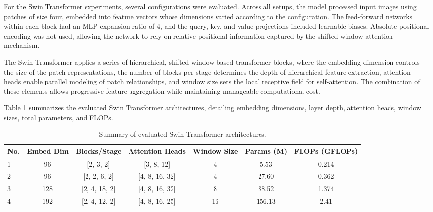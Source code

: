 \documentclass[a4paper,11pt,twoside]{report}
\theoremstyle{definition}
\begin{document}
For the Swin Transformer experiments, several configurations were evaluated. Across all setups, the model processed input images using patches of size four, embedded into feature vectors whose dimensions varied according to the configuration. The feed-forward networks within each block had an MLP expansion ratio of 4, and the query, key, and value projections included learnable biases. Absolute positional encoding was not used, allowing the network to rely on relative positional information captured by the shifted window attention mechanism.

The Swin Transformer applies a series of hierarchical, shifted window-based transformer blocks, where the embedding dimension controls the size of the patch representations, the number of blocks per stage determines the depth of hierarchical feature extraction, attention heads enable parallel modeling of patch relationships, and window size sets the local receptive field for self-attention. The combination of these elements allows progressive feature aggregation while maintaining manageable computational cost.

Table \ref{tab:swin_transformer_architectures} summarizes the evaluated Swin Transformer architectures, detailing embedding dimensions, layer depth, attention heads, window sizes, total parameters, and FLOPs.

\begin{table}[h!]
\centering
\caption{Summary of evaluated Swin Transformer architectures.}
\begin{adjustbox}{max width=\textwidth}
\begin{tabular}{lcccccc}
\hline
\textbf{No.} & \textbf{Embed Dim} & \textbf{Blocks/Stage} & \textbf{Attention Heads} & \textbf{Window Size} & \textbf{Params (M)} & \textbf{FLOPs (GFLOPs)} \\
\hline
1 & 96  & [2, 3, 2]      & [3, 8, 12]      & 4 & 5.53   & 0.214 \\
2 & 96  & [2, 2, 6, 2]   & [4, 8, 16, 32]  & 4 & 27.60  & 0.362 \\
3 & 128 & [2, 4, 18, 2]  & [4, 8, 16, 32]  & 8 & 88.52  & 1.374 \\
4 & 192 & [2, 4, 12, 2]  & [4, 8, 16, 25]  & 16 & 156.13 & 2.41 \\
\hline
\end{tabular}
\end{adjustbox}
\label{tab:swin_transformer_architectures}
\end{table}
\end{document}
